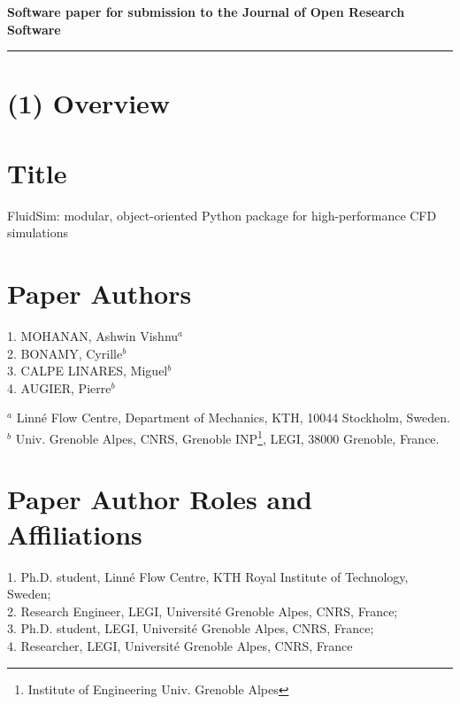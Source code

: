 

{\bf Software paper for submission to the Journal of Open Research Software} \\

\rule{\textwidth}{1pt}

\section{(1) Overview}

\vspace{0.5cm}

\section{Title}

FluidSim: modular, object-oriented Python package for high-performance CFD
simulations

\section{Paper Authors}

1. MOHANAN, Ashwin Vishnu$^a$ \\
2. BONAMY, Cyrille$^b$ \\
3. CALPE LINARES, Miguel$^b$ \\
4. AUGIER, Pierre$^b$

\smallskip

$^a$ Linn\'e Flow Centre, Department of Mechanics, KTH, 10044 Stockholm, Sweden.\\
$^b$ Univ. Grenoble Alpes, CNRS, Grenoble INP\footnote{Institute of Engineering
Univ. Grenoble Alpes}, LEGI, 38000 Grenoble, France.

\section{Paper Author Roles and Affiliations}
1. Ph.D. student, Linn\'e Flow Centre, KTH Royal Institute of Technology,
Sweden; \\
2. Research Engineer, LEGI, Universit\'e Grenoble Alpes, CNRS, France; \\
3. Ph.D. student, LEGI, Universit\'e Grenoble Alpes, CNRS, France; \\
4. Researcher, LEGI, Universit\'e Grenoble Alpes, CNRS, France

